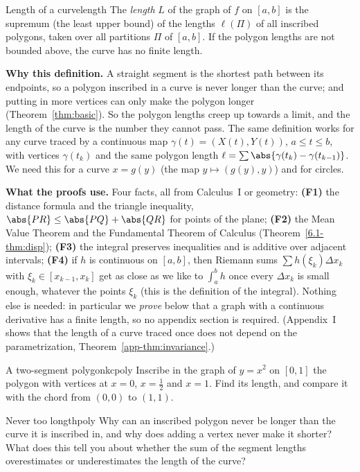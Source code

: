 \documentclass[11pt]{article}
\begin{document}
\begin{defn}{Length of a curve}{length}
The \emph{length} $L$ of the graph of $f$ on $[a,b]$ is the supremum (the least upper bound) of the lengths $\ell(\Pi)$ of all inscribed polygons, taken over all partitions $\Pi$ of $[a,b]$. If the polygon lengths are not bounded above, the curve has no finite length.
\end{defn}

\textbf{Why this definition.} A straight segment is the shortest path between its endpoints, so a polygon inscribed in a curve is never longer than the curve; and putting in more vertices can only make the polygon longer (Theorem~\ref{thm:basic}). So the polygon lengths creep up towards a limit, and the length of the curve is the number they cannot pass. The same definition works for any curve traced by a continuous map $\gamma(t)=(X(t),Y(t))$, $a\le t\le b$, with vertices $\gamma(t_k)$ and the same polygon length $\ell=\sum\abs{\gamma(t_k)-\gamma(t_{k-1})}$. We need this for a curve $x=g(y)$ (the map $y\mapsto(g(y),y)$) and for circles.

\textbf{What the proofs use.} Four facts, all from Calculus~I or geometry: \textbf{(F1)} the distance formula and the triangle inequality, $\abs{PR}\le\abs{PQ}+\abs{QR}$ for points of the plane; \textbf{(F2)} the Mean Value Theorem and the Fundamental Theorem of Calculus (Theorem~\ref{6.1-thm:disp}); \textbf{(F3)} the integral preserves inequalities and is additive over adjacent intervals; \textbf{(F4)} if $h$ is continuous on $[a,b]$, then Riemann sums $\sum h(\xi_k)\Delta x_k$ with $\xi_k\in[x_{k-1},x_k]$ get as close as we like to $\int_a^bh$ once every $\Delta x_k$ is small enough, whatever the points $\xi_k$ (this is the definition of the integral). Nothing else is needed: in particular we \emph{prove} below that a graph with a continuous derivative has a finite length, so no appendix section is required. (Appendix~I shows that the length of a curve traced once does not depend on the parametrization, Theorem~\ref{app-thm:invariance}.)

\begin{kc}{A two-segment polygon}{kcpoly}
Inscribe in the graph of $y=x^2$ on $[0,1]$ the polygon with vertices at $x=0$, $x=\frac12$ and $x=1$. Find its length, and compare it with the chord from $(0,0)$ to $(1,1)$.
\end{kc}

\begin{think}{Never too long}{thpoly}
Why can an inscribed polygon never be longer than the curve it is inscribed in, and why does adding a vertex never make it shorter? What does this tell you about whether the sum of the segment lengths overestimates or underestimates the length of the curve?
\end{think}
\end{document}
